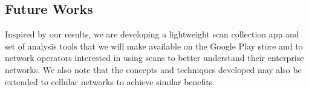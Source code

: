 \begin{comment}
  \subsection{Device Heterogeneity}
  \label{subsec:heterogeneity}

  In the \ubscan{} dataset that is mostly analyzed throughout this paper, all scan
  results are collected from devices of the same model (Nexus 5). We now reflect
  on whether this hardware homogeneity is necessary, and what the impact of device
  heterogeneity would be on each of the case studies.

  \wifi{} chipsets and drivers from various manufacturers may have different
  policies on the scanning rate. Yet, as we showed earlier in
  Section~\ref{sec:scan}, most wireless devices from different vendors perform
  \wifi{} scans quite aggressively. Therefore, the device heterogeneity shall
  have negligible impact on the temporal resolution of the measurements.

  On other hand, \wifi{} chipsets do have various RF characteristics, such as
  carrier sensing range or antenna sensitivity. For instance, when building
  client-perceived conflict graph (\S\ref{subsec:channel}), a more sensitive
  device may reveal more conflict edges than a less sensitive one. And
  similarly, devices with different sensitivity levels may disagree on the
  offending set of the same RAP (\S\ref{subsec:rogue}).

  To tolerate such diversity, the measurement post-processing logic can either
  be aggressive by adopting the superset of observations from different
  devices, or be conservative and only consider common conflicts reported by
  most devices. Additionally, note that relative ordering of the APs by
  signal strength is usually consistent for each device, therefore the device
  heterogeneity has minimal impact on the spatial planning case study, where
  only the relative ordering of the APs instead of the absolute RSSI values is
  utilized.

\end{comment}

\subsection{Future Works}

Inspired by our results, we are developing a lightweight scan collection app
and set of analysis tools that we will make available on the Google Play
store and to network operators interested in using scans to better
understand their enterprise \wifi{} networks. We also note that the concepts and
techniques developed may also be extended to cellular networks to achieve
similar benefits.
